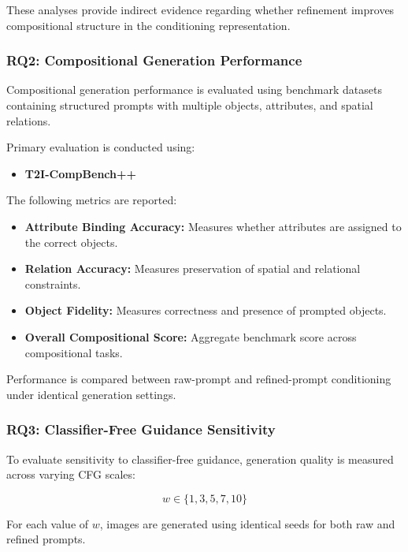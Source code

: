 \documentclass[a4paper,twoside,12pt]{report}
\begin{document}
These analyses provide indirect evidence regarding whether refinement improves compositional structure in the conditioning representation.

\subsubsection{RQ2: Compositional Generation Performance}

Compositional generation performance is evaluated using benchmark datasets containing structured prompts with multiple objects, attributes, and spatial relations.

Primary evaluation is conducted using:

\begin{itemize}
    \item \textbf{T2I-CompBench++} \citep{huang2023t2icompbench}
\end{itemize}

The following metrics are reported:

\begin{itemize}
    \item \textbf{Attribute Binding Accuracy:} Measures whether attributes are assigned to the correct objects.

    \item \textbf{Relation Accuracy:} Measures preservation of spatial and relational constraints.

    \item \textbf{Object Fidelity:} Measures correctness and presence of prompted objects.

    \item \textbf{Overall Compositional Score:} Aggregate benchmark score across compositional tasks.
\end{itemize}

Performance is compared between raw-prompt and refined-prompt conditioning under identical generation settings.

\subsubsection{RQ3: Classifier-Free Guidance Sensitivity}

To evaluate sensitivity to classifier-free guidance, generation quality is measured across varying CFG scales:

\[
w \in \{1, 3, 5, 7, 10\}
\]

For each value of \(w\), images are generated using identical seeds for both raw and refined prompts.
\end{document}

